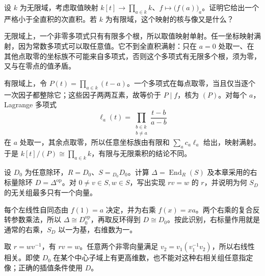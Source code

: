 \begin{exercise}\label{b2:ex:14-evaluation-subdirect}
	设 \(k\) 为无限域，考虑取值映射 \(k[t]\rightarrow\prod_{a\in k}k\)、\(f\mapsto\bigl(f(a)\bigr)_a\)。证明它给出一个严格小于全直积的次直积。若 \(k\) 为有限域，这个映射的核与像又是什么？
\end{exercise}
\begin{solution}
	无限域上，一个非零多项式只有有限多个根，所以取值映射单射。任一坐标映射满射，因为常数多项式可以取任意值。它不到全直积满射：只在 \(a=0\) 处取一、在其他点取零的坐标族不可能来自多项式，否则这个多项式有无限多个根，须为零，又与在零点的值矛盾。

	有限域上，令 \(P(t)=\prod_{a\in k}(t-a)\)。一个多项式在每点取零，当且仅当逐个一次因子都整除它；这些因子两两互素，故等价于 \(P\mid f\)，核为 \((P)\)。对每个 \(a\)，Lagrange 多项式
	\[
		\ell_a(t)=\prod_{\substack{b\in k\\b\ne a}}\frac{t-b}{a-b}
	\]
	在 \(a\) 处取一，其余点取零，所以任意坐标族由有限和 \(\sum_a c_a\ell_a\) 给出，映射满射。于是 \(k[t]/(P)\cong\prod_{a\in k}k\)，有限与无限乘积的结论不同。
\end{solution}

\begin{exercise}\label{b2:ex:14-right-division-scalars}
	设 \(D_0\) 为任意除环，\(R=D_0\)、\(S={}_{D_0}D_0\)。计算 \(\Delta=\operatorname{End}_R(S)\) 及本章采用的右标量除环 \(D=\Delta^{\mathrm{op}}\)。对 \(0\ne v\in S,w\in S\)，写出实现 \(rv=w\) 的 \(r\)，并说明为何 \(S_D\) 的无关组最多只有一个向量。
\end{exercise}
\begin{solution}
	每个左线性自同态由 \(f(1)=a\) 决定，并为右乘 \(f(x)=xa\)。两个右乘的复合反转参数乘法，所以 \(\Delta\cong D_0^{\mathrm{op}}\)，再取反环得到 \(D\cong D_0\)。按此识别，右标量作用就是通常的右乘，\(S_D\) 以一为基，右维数为一。

	取 \(r=wv^{-1}\)，有 \(rv=w\)。任意两个非零向量满足 \(v_2=v_1(v_1^{-1}v_2)\)，所以右线性相关。即使 \(D_0\) 在某个中心子域上有更高维数，也不能对这种右相关组任意指定像；正确的插值条件使用 \(D\)。
\end{solution}

